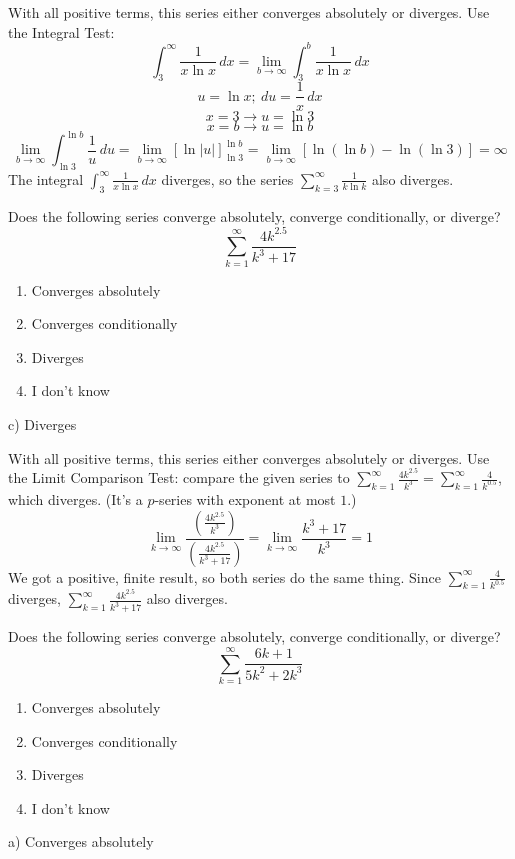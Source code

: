 \documentclass[addpoints,12pt,answers]{exam}
\begin{document}
\begin{questions}
\begin{solution}
    With all positive terms, this series either converges absolutely or diverges. Use the Integral Test:
    $$\int_3^\infty\frac{1}{x\ln x}\,dx=\lim_{b\to\infty}\int_3^b\frac{1}{x\ln x}\,dx$$
    $$u=\ln x; \ du=\frac{1}{x}\,dx$$
    $$x=3\longrightarrow u=\ln 3$$
    $$x=b\longrightarrow u=\ln b$$
    $$\lim_{b\to\infty}\int_{\ln 3}^{\ln b}\frac{1}{u}\,du=\lim_{b\to\infty}[\ln|u|]_{\ln 3}^{\ln b}=\lim_{b\to\infty}[\ln(\ln b)-\ln(\ln 3)]=\infty$$
    The integral $\displaystyle\int_3^\infty\frac{1}{x\ln x}\,dx$ diverges, so the series $\displaystyle\sum_{k=3}^\infty\frac{1}{k\ln k}$ also diverges.
  \end{solution}
  \newpage
  \question
  Does the following series converge absolutely, converge conditionally, or diverge?
  $$\sum_{k=1}^\infty\frac{4k^{2.5}}{k^3+17}$$
  \begin{enumerate}[label=\alph*)]
    \item
    Converges absolutely
    \item
    Converges conditionally
    \item
    Diverges
    \item
    I don't know
  \end{enumerate}
  \begin{solution}
    c) Diverges
        
    With all positive terms, this series either converges absolutely or diverges. Use the Limit Comparison Test: compare the given series to $\displaystyle\sum_{k=1}^\infty\frac{4k^{2.5}}{k^3}=\sum_{k=1}^\infty\frac{4}{k^{0.5}}$, which diverges. (It's a $p$-series with exponent at most $1$.)
    $$\lim_{k\to\infty}\frac{\left(\frac{4k^{2.5}}{k^3}\right)}{\left(\frac{4k^{2.5}}{k^3+17}\right)}=\lim_{k\to\infty}\frac{k^3+17}{k^3}=1$$
    We got a positive, finite result, so both series do the same thing. Since $\displaystyle\sum_{k=1}^\infty\frac{4}{k^{0.5}}$ diverges, $\displaystyle\sum_{k=1}^\infty\frac{4k^{2.5}}{k^3+17}$ also diverges.
    
  \end{solution}
  \newpage
  \question
  Does the following series converge absolutely, converge conditionally, or diverge?
  $$\sum_{k=1}^\infty\frac{6k+1}{5k^2+2k^3}$$
  \begin{enumerate}[label=\alph*)]
    \item
    Converges absolutely
    \item
    Converges conditionally
    \item
    Diverges
    \item
    I don't know
  \end{enumerate}
  \begin{solution}
    a) Converges absolutely
        

\end{solution}
\end{questions}
\end{document}
